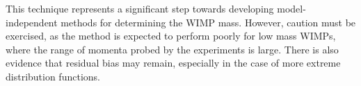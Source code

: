This technique represents a significant step towards developing model-independent methods for determining the WIMP mass. However, caution must be exercised, as the method is expected to perform poorly for low mass WIMPs, where the range of momenta probed by the experiments is large. There is also evidence that residual bias may remain, especially in the case of more extreme distribution functions.



